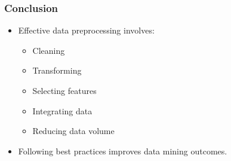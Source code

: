 \documentclass{beamer}
\begin{document}
\begin{frame}[fragile]
    \frametitle{Conclusion}
    \begin{itemize}
        \item Effective data preprocessing involves:
        \begin{itemize}
            \item Cleaning
            \item Transforming
            \item Selecting features
            \item Integrating data
            \item Reducing data volume
        \end{itemize}
        \item Following best practices improves data mining outcomes.
    \end{itemize}
\end{frame}
\end{document}
